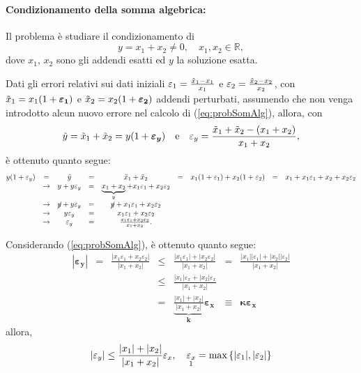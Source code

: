 \paragraph{Condizionamento della somma algebrica:} Il problema è studiare il condizionamento di
\begin{equation}\label{eq:probSomAlg}
    y=x_1+x_2\neq 0,\quad x_1,x_2\in\mathbb R,
\end{equation}
dove $x_1,\, x_2$ sono gli addendi esatti ed $y$ la soluzione esatta.

Dati gli errori relativi sui dati iniziali $\varepsilon_1=\frac{\Tilde{x}_1-x_1}{x_1}$ e $\varepsilon_2=\frac{\Tilde{x}_2-x_2}{x_2}$, con $\Tilde{x}_1=x_1(1+\boldsymbol{\varepsilon_1})$ e $\Tilde{x}_2=x_2(1+\boldsymbol{\varepsilon_2})$ addendi perturbati, assumendo che non venga introdotto alcun nuovo errore nel calcolo di (\ref{eq:probSomAlg}), allora, con
\begin{equation*}
    \Tilde{y}=\Tilde{x}_1+\Tilde{x}_2=y(1+\boldsymbol{\varepsilon_y})\quad\text{e}\quad\varepsilon_y=\frac{\Tilde{x}_1+\Tilde{x}_2-(x_1+x_2)}{x_1+x_2},
\end{equation*}
è ottenuto quanto segue:
\begin{equation*}
   \begin{matrix}
        y(1+\varepsilon_y)&=&\Tilde{y}&=&\Tilde{x}_1+\Tilde{x}_2&=&x_1(1+\varepsilon_1)+x_2(1+\varepsilon_2)&=&x_1+x_1\varepsilon_1+x_2+x_2\varepsilon_2\\
        &\rightarrow& y+y\varepsilon_y&=&\underbrace{x_1+x_2}_{y}+x_1\varepsilon_1+x_2\varepsilon_2\\
        &\rightarrow& \cancel{y}+y\varepsilon_y &=& \cancel{y}+x_1\varepsilon_1+x_2\varepsilon_2\\
        &\rightarrow& y\varepsilon_y &=& x_1\varepsilon_1+x_2\varepsilon_2 \\
        &\rightarrow& \varepsilon_y &=& \frac{x_1\varepsilon_1+x_2\varepsilon_2}{x_1+x_2}.
   \end{matrix}
\end{equation*}

Considerando (\ref{eq:probSomAlg}), è ottenuto quanto segue:
\begin{equation*}
        \begin{matrix}
            \boldsymbol{|\varepsilon_y|} &=&\frac{|x_1\varepsilon_1+x_2\varepsilon_2|}{|x_1+x_2|} &\leq& \frac{|x_1\varepsilon_1|+|x_2\varepsilon_2|}{|x_1+x_2|}&=& \frac{|x_1||\varepsilon_1|+|x_2||\varepsilon_2|}{|x_1+x_2|}\\
            && &\leq& \frac{|x_1|\varepsilon_x+|x_2|\varepsilon_x}{|x_1+x_2|}\\
            && &=& \underbrace{\frac{|x_1|+|x_2|}{|x_1+x_2|}}_{\boldsymbol k}\boldsymbol{\varepsilon_x} &\equiv& \boldsymbol{\kappa\varepsilon_x}
        \end{matrix}
\end{equation*}
allora,
\begin{equation*}
    |\varepsilon_y| \leq \frac{|x_1|+|x_2|}{|x_1+x_2|}\varepsilon_x, \quad \underset{\footnotemark}{\varepsilon_x}=\max\left\{|\varepsilon_1|,|\varepsilon_2|\right\}
\end{equation*}

